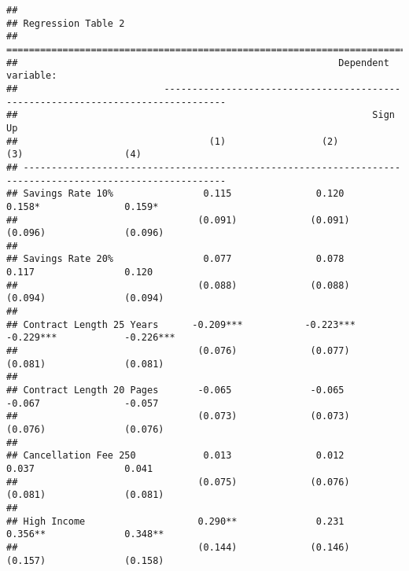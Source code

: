 \documentclass[
]{article}
\begin{document}
\begin{verbatim}
## 
## Regression Table 2
## ==========================================================================================================
##                                                         Dependent variable:                               
##                          ---------------------------------------------------------------------------------
##                                                               Sign Up                                     
##                                  (1)                 (2)                 (3)                  (4)         
## ----------------------------------------------------------------------------------------------------------
## Savings Rate 10%                0.115               0.120               0.158*               0.159*       
##                                (0.091)             (0.091)             (0.096)              (0.096)       
##                                                                                                           
## Savings Rate 20%                0.077               0.078               0.117                0.120        
##                                (0.088)             (0.088)             (0.094)              (0.094)       
##                                                                                                           
## Contract Length 25 Years      -0.209***           -0.223***           -0.229***            -0.226***      
##                                (0.076)             (0.077)             (0.081)              (0.081)       
##                                                                                                           
## Contract Length 20 Pages       -0.065              -0.065               -0.067               -0.057       
##                                (0.073)             (0.073)             (0.076)              (0.076)       
##                                                                                                           
## Cancellation Fee 250            0.013               0.012               0.037                0.041        
##                                (0.075)             (0.076)             (0.081)              (0.081)       
##                                                                                                           
## High Income                    0.290**              0.231              0.356**              0.348**       
##                                (0.144)             (0.146)             (0.157)              (0.158)       

\end{verbatim}
\end{document}

